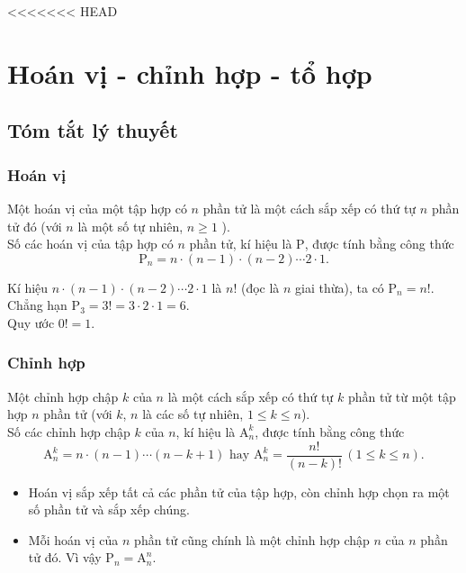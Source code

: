 <<<<<<< HEAD
\def\tenchude{HOÁN VỊ - CHỈNH HỢP - TỔ HỢP}
\newpage \setcounter{dang}{0}
\section{Hoán vị - chỉnh hợp - tổ hợp}
\subsection{Tóm tắt lý thuyết}
\subsubsection{Hoán vị}
\begin{dn}{}
	Một hoán vị của một tập hợp có $n$ phần tử là một cách sắp xếp có thứ tự $n$ phần tử đó (với $n$ là một số tự nhiên, $n \geq 1$ ).\\
	Số các hoán vị của tập hợp có $n$ phần tử, kí hiệu là $\mathrm{P}$, được tính bằng công thức $$\mathrm{P}_{n}=n \cdot(n-1) \cdot(n-2) \cdots 2 \cdot 1.$$
\end{dn}

\begin{note}
	Kí hiệu $n \cdot(n-1) \cdot(n-2) \cdots 2 \cdot 1$ là $n!$ (đọc là $n$ giai thừa), ta có $\mathrm{P}_{n}=n!$. Chẳng hạn $\mathrm{P}_{3}=3!=3 \cdot 2 \cdot 1=6$.\\
	Quy ước $0 !=1$.
\end{note}

\subsubsection{Chỉnh hợp}
\begin{dn}{}
	Một chỉnh hợp chập $k$ của $n$ là một cách sắp xếp có thứ tự $k$ phần tử từ một tập hợp $n$ phần tử (với $k$, $n$ là các số tự nhiên, $1 \leq k \leq n$).\\
	Số các chỉnh hợp chập $k$ của $n$, kí hiệu là $\mathrm{A}_{n}^{k}$, được tính bằng công thức
	$$\mathrm{A}_{n}^{k}=n \cdot(n-1) \cdots(n-k+1) \text { hay } \mathrm{A}_{n}^{k}=\dfrac{n!}{(n-k)!}\,(1 \leq k \leq n).$$
\end{dn}

\begin{note}
	\begin{itemize}
		\item Hoán vị sắp xếp tất cả các phần tử của tập hợp, còn chỉnh hợp chọn ra một số phần tử và sắp xếp chúng.
		\item Mỗi hoán vị của $n$ phần tử cũng chính là một chỉnh hợp chập $n$ của $n$ phần tử đó. Vì vậy $\mathrm{P}_{n}=\mathrm{A}_{n}^{n}$.
	\end{itemize}
\end{note}

